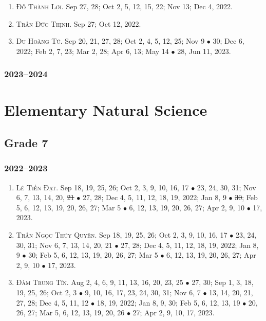 \documentclass{article}
\begin{document}
\begin{enumerate}
	\item \textsc{Đỗ Thành Lợi.} {\sf[In]} Sep 27, 28; Oct 2, 5, 12, 15, 22; Nov 13; Dec 4, 2022. {\sf[Out]}
	\item \textsc{Trần Đức Thịnh.} {\sf[In]} Sep 27; Oct 12, 2022. {\sf[Out]}
	\item \textsc{Du Hoàng Tú.} {\sf[In]} Sep 20, 21, 27, 28; Oct 2, 4, 5, 12, 25; Nov 9 $\bullet$ 30; Dec 6, 2022; Feb 2, 7, 23; Mar 2, 28; Apr 6, 13; May 14 $\bullet$ 28, Jun 11, 2023. {\sf[Out]}
\end{enumerate}

\subsubsection{2023--2024}


\section{Elementary Natural Science}

\subsection{Grade 7}

\subsubsection{2022--2023}

\begin{enumerate}
	\item \textsc{Lê Tiến Đạt.} {\sf[In]} Sep 18, 19, 25, 26; Oct 2, 3, 9, 10, 16, 17 $\bullet$ 23, 24, 30, 31; Nov 6, 7, 13, 14, 20, \st{21} $\bullet$ 27, 28; Dec 4, 5, 11, 12, 18, 19, 2022; Jan 8, 9 $\bullet$ \st{30}; Feb 5, 6, 12, 13, 19, 20, 26, 27; Mar 5 $\bullet$ 6, 12, 13, 19, 20, 26, 27; Apr 2, 9, 10 $\bullet$ 17, 2023.
	\item \textsc{Trần Ngọc Thúy Quyên.} {\sf[In]} Sep 18, 19, 25, 26; Oct 2, 3, 9, 10, 16, 17 $\bullet$ 23, 24, 30, 31; Nov 6, 7, 13, 14, 20, 21 $\bullet$ 27, 28; Dec 4, 5, 11, 12, 18, 19, 2022; Jan 8, 9 $\bullet$ 30; Feb 5, 6, 12, 13, 19, 20, 26, 27; Mar 5 $\bullet$ 6, 12, 13, 19, 20, 26, 27; Apr 2, 9, 10 $\bullet$ 17, 2023.
	\item \textsc{Đàm Trung Tín.} {\sf[In]} Aug 2, 4, 6, 9, 11, 13, 16, 20, 23, 25 $\bullet$ 27, 30; Sep 1, 3, 18, 19, 25, 26; Oct 2, 3 $\bullet$ 9, 10, 16, 17, 23, 24, 30, 31; Nov 6, 7 $\bullet$ 13, 14, 20, 21, 27, 28; Dec 4, 5, 11, 12 $\bullet$ 18, 19, 2022; Jan 8, 9, 30; Feb 5, 6, 12, 13, 19 $\bullet$ 20, 26, 27; Mar 5, 6, 12, 13, 19, 20, 26 $\bullet$ 27; Apr 2, 9, 10, 17, 2023. {\sf[Out]}
\end{enumerate}
\end{document}
